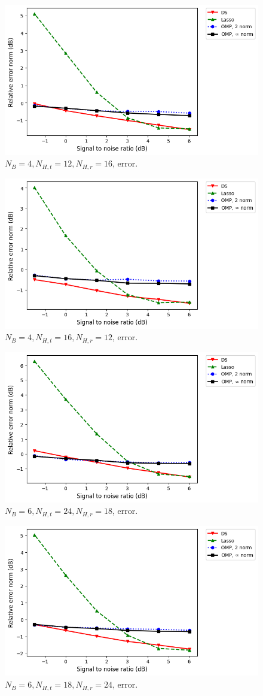 \documentclass[journal]{IEEEtran}
\newcommand {\m} [1] {\( #1 \)}
\begin{document}
\begin {figure} [H]
\includegraphics [width = 0.45 \textwidth]
{error-medium-more-tall-six-usual.png}
\caption {\m {N_B = 4, N_{H,t} = 12, N_{H,r} = 16}, error.}
\end {figure}

\begin {figure} [H]
\includegraphics [width = 0.45 \textwidth]
{error-medium-more-wide-six-usual.png}
\caption {\m {N_B = 4, N_{H,t} = 16, N_{H,r} = 12}, error.}
\end {figure}

\begin {figure} [H]
\includegraphics [width = 0.45 \textwidth]
{error-big-more-tall-six-usual.png}
\caption {\m {N_B = 6, N_{H,t} = 24, N_{H,r} = 18}, error.}
\end {figure}

\begin {figure} [H]
\includegraphics [width = 0.45 \textwidth]
{error-big-more-wide-six-usual.png}
\caption {\m {N_B = 6, N_{H,t} = 18, N_{H,r} = 24}, error.}
\end {figure}
\end{document}
